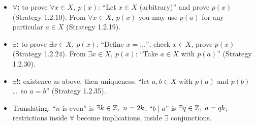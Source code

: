 
\begin{key}
\begin{itemize}
\item \textbf{$\forall$:} to prove $\forall x\in X,\ p(x)$: ``Let $x\in X$ (arbitrary)'' and prove $p(x)$ (Strategy 1.2.10). From $\forall x\in X,\ p(x)$ you may use $p(a)$ for any particular $a\in X$ (Strategy 1.2.19).
\item \textbf{$\exists$:} to prove $\exists x\in X,\ p(x)$: ``Define $x=\dots$'', check $x\in X$, prove $p(x)$ (Strategy 1.2.24). From $\exists x\in X,\ p(x)$: ``Take $a\in X$ with $p(a)$'' (Strategy 1.2.30).
\item \textbf{$\exists!$:} existence as above, then uniqueness: ``let $a,b\in X$ with $p(a)$ and $p(b)$ \dots\ so $a=b$'' (Strategy 1.2.35).
\item Translating: ``$n$ is even'' is $\exists k\in\mathbb{Z},\ n=2k$; ``$b\mid a$'' is $\exists q\in\mathbb{Z},\ a=qb$; restrictions inside $\forall$ become implications, inside $\exists$ conjunctions.
\end{itemize}
\end{key}

